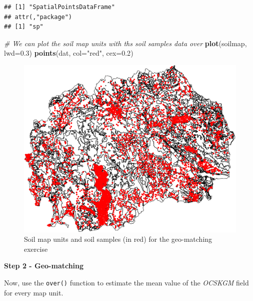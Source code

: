 \documentclass[10pt,b5paper,]{book}
\newenvironment{Shaded}{\begin{snugshade}}{\end{snugshade}}
\newcommand{\CommentTok}[1]{\textcolor[rgb]{0.56,0.35,0.01}{\textit{#1}}}
\newcommand{\DataTypeTok}[1]{\textcolor[rgb]{0.13,0.29,0.53}{#1}}
\newcommand{\DecValTok}[1]{\textcolor[rgb]{0.00,0.00,0.81}{#1}}
\newcommand{\FloatTok}[1]{\textcolor[rgb]{0.00,0.00,0.81}{#1}}
\newcommand{\KeywordTok}[1]{\textcolor[rgb]{0.13,0.29,0.53}{\textbf{#1}}}
\newcommand{\NormalTok}[1]{#1}
\newcommand{\OperatorTok}[1]{\textcolor[rgb]{0.81,0.36,0.00}{\textbf{#1}}}
\newcommand{\StringTok}[1]{\textcolor[rgb]{0.31,0.60,0.02}{#1}}
\theoremstyle{definition}
\theoremstyle{definition}
\theoremstyle{definition}
\theoremstyle{remark}
\begin{document}
\begin{verbatim}
## [1] "SpatialPointsDataFrame"
## attr(,"package")
## [1] "sp"
\end{verbatim}

\begin{Shaded}
\begin{Highlighting}[]
\CommentTok{# We can plot the soil map units with ths soil samples data over}
\KeywordTok{plot}\NormalTok{(soilmap, }\DataTypeTok{lwd=}\FloatTok{0.3}\NormalTok{)}
\KeywordTok{points}\NormalTok{(dat, }\DataTypeTok{col=}\StringTok{"red"}\NormalTok{, }\DataTypeTok{cex=}\FloatTok{0.2}\NormalTok{)}
\end{Highlighting}
\end{Shaded}

\begin{figure}
\centering
\includegraphics{SOCMapping_files/figure-latex/unnamed-chunk-30-1.pdf}
\caption{\label{fig:unnamed-chunk-30}Soil map units and soil samples (in
red) for the geo-matching exercise}
\end{figure}

\textbf{Step 2 - Geo-matching}

Now, use the \texttt{over()} function to estimate the mean value of the
\emph{OCSKGM} field for every map unit.

\begin{Shaded}
\end{Shaded}
\end{document}
